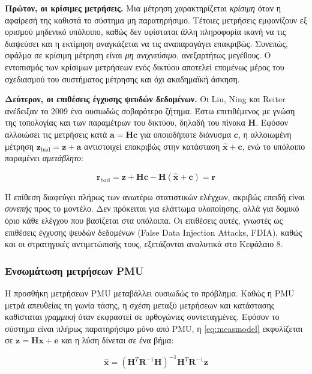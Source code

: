 \textbf{Πρώτον, οι κρίσιμες μετρήσεις.} Μια μέτρηση χαρακτηρίζεται \emph{κρίσιμη} όταν η
αφαίρεσή της καθιστά το σύστημα μη παρατηρήσιμο. Τέτοιες μετρήσεις εμφανίζουν εξ ορισμού
μηδενικό υπόλοιπο, καθώς δεν υφίσταται άλλη πληροφορία ικανή να τις διαψεύσει και η
εκτίμηση αναγκάζεται να τις αναπαραγάγει επακριβώς. Συνεπώς, σφάλμα σε κρίσιμη μέτρηση
είναι \emph{μη ανιχνεύσιμο}, ανεξαρτήτως μεγέθους. Ο εντοπισμός των κρίσιμων μετρήσεων ενός
δικτύου αποτελεί επομένως μέρος του σχεδιασμού του συστήματος μέτρησης και όχι ακαδημαϊκή
άσκηση.

\textbf{Δεύτερον, οι επιθέσεις έγχυσης ψευδών δεδομένων.} Οι Liu, Ning και Reiter ανέδειξαν
το 2009 ένα ουσιωδώς σοβαρότερο ζήτημα. Έστω επιτιθέμενος με γνώση της τοπολογίας και των
παραμέτρων του δικτύου, δηλαδή του πίνακα $\mathbf{H}$. Εφόσον αλλοιώσει τις μετρήσεις κατά
$\mathbf{a} = \mathbf{H}\mathbf{c}$ για οποιοδήποτε διάνυσμα $\mathbf{c}$, η αλλοιωμένη
μέτρηση $\mathbf{z}_{\text{bad}} = \mathbf{z} + \mathbf{a}$ αντιστοιχεί επακριβώς στην
κατάσταση $\hat{\mathbf{x}} + \mathbf{c}$, ενώ το υπόλοιπο παραμένει \emph{αμετάβλητο}:

\begin{equation}
\mathbf{r}_{\text{bad}} = \mathbf{z} + \mathbf{H}\mathbf{c}
        - \mathbf{H}(\hat{\mathbf{x}} + \mathbf{c}) = \mathbf{r}
\label{eq:fdia}
\end{equation}

Η επίθεση διαφεύγει πλήρως των ανωτέρω στατιστικών ελέγχων, ακριβώς επειδή είναι
\emph{συνεπής} προς το μοντέλο. Δεν πρόκειται για ελάττωμα υλοποίησης, αλλά για δομικό όριο
κάθε ελέγχου που βασίζεται στα υπόλοιπα. Οι επιθέσεις αυτές, γνωστές ως επιθέσεις έγχυσης
ψευδών δεδομένων (False Data Injection Attacks, FDIA), καθώς και οι στρατηγικές
αντιμετώπισής τους, εξετάζονται αναλυτικά στο Κεφάλαιο 8.

\subsubsection*{Ενσωμάτωση μετρήσεων PMU}

Η προσθήκη μετρήσεων PMU μεταβάλλει ουσιωδώς το πρόβλημα. Καθώς η PMU μετρά απευθείας τη
γωνία τάσης, η σχέση μεταξύ μετρήσεων και κατάστασης καθίσταται \emph{γραμμική} όταν
εκφραστεί σε ορθογώνιες συντεταγμένες. Εφόσον το σύστημα είναι πλήρως παρατηρήσιμο μόνο
από PMU, η \eqref{eq:measmodel} εκφυλίζεται σε
$\mathbf{z} = \mathbf{H}\mathbf{x} + \mathbf{e}$ και η λύση δίνεται σε ένα βήμα:

\begin{equation}
\hat{\mathbf{x}} = \left(\mathbf{H}^{T}\mathbf{R}^{-1}\mathbf{H}\right)^{-1}
                    \mathbf{H}^{T}\mathbf{R}^{-1}\mathbf{z}
\label{eq:linse}
\end{equation}

